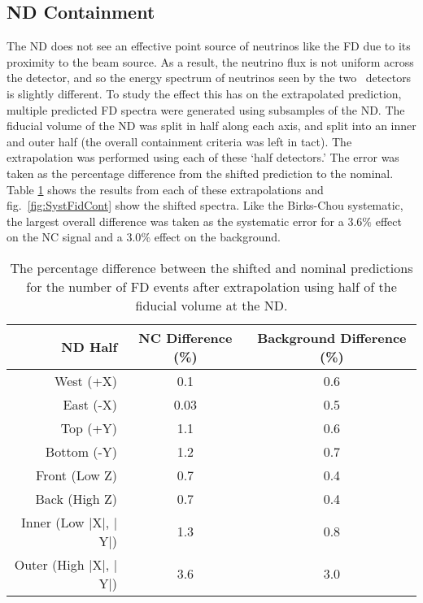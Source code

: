 \begin{doublespace}
\section{ND Containment}

The ND does not see an effective point source of neutrinos like the FD due to its proximity to the beam source. As a result, the neutrino flux is not uniform across the detector, and so the energy spectrum of neutrinos seen by the two \nova~detectors is slightly different. To study the effect this has on the extrapolated prediction, multiple predicted FD spectra were generated using subsamples of the ND. The fiducial volume of the ND was split in half along each axis, and split into an inner and outer half (the overall containment criteria was left in tact). The extrapolation was performed using each of these `half detectors.' The error was taken as the percentage difference from the shifted prediction to the nominal. Table \ref{tab:SystFidCont} shows the results from each of these extrapolations and fig.~\ref{fig:SystFidCont} show the shifted spectra. Like the Birks-Chou systematic, the largest overall difference was taken as the systematic error for a $3.6\%$ effect on the NC signal and a $3.0\%$ effect on the background.
\begin{table}[h]
  \begin{center}
    \caption[ND Containment Systematic Errors]{The percentage difference between the shifted and nominal predictions for the number of FD events after extrapolation using half of the fiducial volume at the ND.}
    \label{tab:SystFidCont}
    \begin{tabular}{r c c}
      \hline\hline
      ND Half & NC Difference (\%) & Background Difference (\%) \\
      \hline
      West (+X) & 0.1 & 0.6 \\
      East (-X) & 0.03 & 0.5 \\
      Top (+Y) & 1.1 & 0.6 \\
      Bottom (-Y) & 1.2 & 0.7 \\
      Front (Low Z) & 0.7 & 0.4 \\
      Back (High Z) & 0.7 & 0.4 \\
      Inner (Low $\vert$X$\vert$, $\vert$Y$\vert$) & 1.3 & 0.8 \\
      Outer (High $\vert$X$\vert$, $\vert$Y$\vert$) & 3.6 & 3.0 \\
      \hline
    \end{tabular}
  \end{center}
\end{table}


\end{doublespace}
